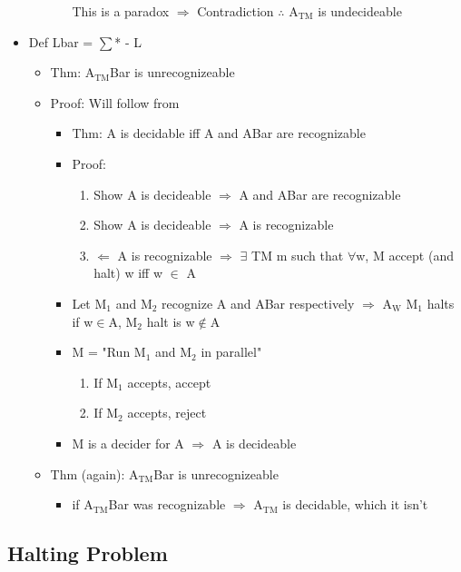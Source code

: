 \documentclass[11pt]{article}
\begin{document}
\begin{itemize}
\begin{itemize}
\begin{itemize}
  This is a paradox \(\Rightarrow\) Contradiction
  \(\therefore\) A\(_{\text{TM}}\) is undecideable
\end{itemize}
\end{itemize}
\item Def Lbar = \(\sum\)* - L
\begin{itemize}
\item Thm: A\(_{\text{TM}}\)Bar is unrecognizeable
\item Proof: Will follow from 
\begin{itemize}
\item Thm: A is decidable iff A and ABar are recognizable
\item Proof: 
\begin{enumerate}
\item Show A is decideable \(\Rightarrow\) A and ABar are recognizable
\item Show A is decideable \(\Rightarrow\) A is recognizable
\item \(\Leftarrow\) A is recognizable \(\Rightarrow\) \(\exists\) TM m such that \(\forall\)w, M accept (and halt) w iff w \(\in\) A
\end{enumerate}
\end{itemize}
\begin{itemize}
\item Let M\(_{\text{1}}\) and M\(_{\text{2}}\) recognize A and ABar respectively \(\Rightarrow\) A\(_{\text{W}}\) M\(_{\text{1}}\) halts if w\(\in\)A, M\(_{\text{2}}\) halt is w\(\notin\)A
\item M = "Run M\(_{\text{1}}\) and M\(_{\text{2}}\) in parallel"
\begin{enumerate}
\item If M\(_{\text{1}}\) accepts, accept
\item If M\(_{\text{2}}\) accepts, reject
\end{enumerate}
\item M is a decider for A \(\Rightarrow\) A is decideable
\end{itemize}
\item Thm (again): A\(_{\text{TM}}\)Bar is unrecognizeable
\begin{itemize}
\item if A\(_{\text{TM}}\)Bar was recognizable \(\Rightarrow\) A\(_{\text{TM}}\) is decidable, which it isn't
\end{itemize}
\end{itemize}
\end{itemize}
\subsection{Halting Problem}
\label{sec:org2b04cb3}
\end{document}

